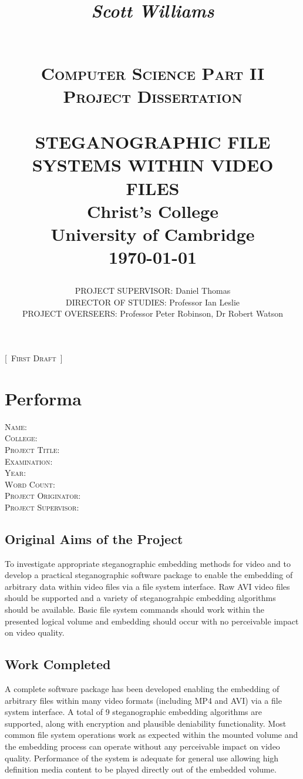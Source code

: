 \documentclass[paper=a4, fontsize=11pt,twoside]{scrartcl}    %
\title{
	\begin{flushright}
		\LARGE{\textit{Scott Williams}}
	\end{flushright}
	~\\[2.0cm]			
	\normalsize \textsc{Computer Science Part II Project Dissertation}\\[2.0cm]     
    \HRule{0.5pt} \\                        
    \LARGE \textbf{\uppercase{Steganographic file systems within video files}}    
    \HRule{2pt} \\[30pt]        
    \normalsize Christ's College\\[5pt]University of Cambridge\\[25pt]           
    \normalsize \today            
}
\author{
    \begin{spacing}{1.5}
        \noindent
        \uppercase{Project Supervisor}: Daniel Thomas\\    
        \uppercase{Director of Studies}: Professor Ian Leslie\\    
        \uppercase{Project Overseers}: Professor Peter Robinson, Dr Robert Watson\\
    \end{spacing}
}
\makeatletter
\numberwithin{table}{section}
\numberwithin{figure}{section}
\numberwithin{algorithm}{section}
\def\printtitle{%
    {\centering \@title\par}}
\newcommand\blankpage{%
    \null
    \thispagestyle{empty}%
    \addtocounter{page}{-1}%
    \newpage}
\makeatother
\begin{document}
\renewcommand{\thelstlisting}{\thesection.\arabic{lstlisting}}
\thispagestyle{empty}        

\printtitle                    
\vfill
\begin{center}
\huge{[~}\normalsize \textsc{First Draft}\huge{~]}
\end{center}
\afterpage{\blankpage}
\newpage
\setcounter{page}{1}        
\section*{Performa}
\textsc{Name}: \\
\textsc{College}: \\
\textsc{Project Title}: \\
\textsc{Examination}: \\
\textsc{Year}: \\
\textsc{Word Count}: \\
\textsc{Project Originator}: \\
\textsc{Project Supervisor}: \\

\subsection*{Original Aims of the Project}
To investigate appropriate steganographic embedding methods for video and to develop a practical steganographic software package to enable the embedding of arbitrary data within video files via a file system interface. Raw AVI video files should be supported and a variety of steganograhpic embedding algorithms should be available. Basic file system commands should work within the presented logical volume and embedding should occur with no perceivable impact on video quality.

\subsection*{Work Completed}
A complete software package has been developed enabling the embedding of arbitrary files within many video formats (including MP4 and AVI) via a file system interface. A total of 9 steganographic embedding algorithms are supported, along with encryption and plausible deniability functionality. Most common file system operations work as expected within the mounted volume and the embedding process can operate without any perceivable impact on video quality. Performance of the system is adequate for general use allowing high definition media content to be played directly out of the embedded volume.
\end{document}
